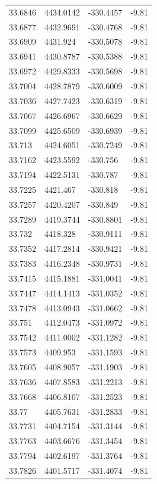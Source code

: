 \begin{table}[H]
\begin{tabular}{llll}
33.6846 & 4434.0142 & -330.4457 & -9.81 \\
33.6877 & 4432.9691 & -330.4768 & -9.81 \\
33.6909 & 4431.924 & -330.5078 & -9.81 \\
33.6941 & 4430.8787 & -330.5388 & -9.81 \\
33.6972 & 4429.8333 & -330.5698 & -9.81 \\
33.7004 & 4428.7879 & -330.6009 & -9.81 \\
33.7036 & 4427.7423 & -330.6319 & -9.81 \\
33.7067 & 4426.6967 & -330.6629 & -9.81 \\
33.7099 & 4425.6509 & -330.6939 & -9.81 \\
33.713 & 4424.6051 & -330.7249 & -9.81 \\
33.7162 & 4423.5592 & -330.756 & -9.81 \\
33.7194 & 4422.5131 & -330.787 & -9.81 \\
33.7225 & 4421.467 & -330.818 & -9.81 \\
33.7257 & 4420.4207 & -330.849 & -9.81 \\
33.7289 & 4419.3744 & -330.8801 & -9.81 \\
33.732 & 4418.328 & -330.9111 & -9.81 \\
33.7352 & 4417.2814 & -330.9421 & -9.81 \\
33.7383 & 4416.2348 & -330.9731 & -9.81 \\
33.7415 & 4415.1881 & -331.0041 & -9.81 \\
33.7447 & 4414.1413 & -331.0352 & -9.81 \\
33.7478 & 4413.0943 & -331.0662 & -9.81 \\
33.751 & 4412.0473 & -331.0972 & -9.81 \\
33.7542 & 4411.0002 & -331.1282 & -9.81 \\
33.7573 & 4409.953 & -331.1593 & -9.81 \\
33.7605 & 4408.9057 & -331.1903 & -9.81 \\
33.7636 & 4407.8583 & -331.2213 & -9.81 \\
33.7668 & 4406.8107 & -331.2523 & -9.81 \\
33.77 & 4405.7631 & -331.2833 & -9.81 \\
33.7731 & 4404.7154 & -331.3144 & -9.81 \\
33.7763 & 4403.6676 & -331.3454 & -9.81 \\
33.7794 & 4402.6197 & -331.3764 & -9.81 \\
33.7826 & 4401.5717 & -331.4074 & -9.81 \\

\end{tabular}
\end{table}

